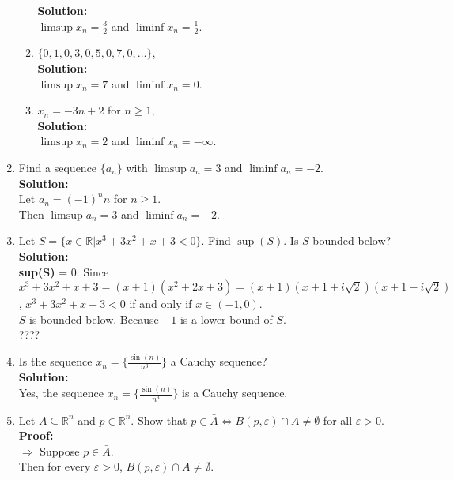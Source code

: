 \documentclass{article}
\begin{document}
\begin{enumerate}
\begin{enumerate}
    \textbf{Solution:} \\
    $\limsup x_n = \frac{3}{2}$ and $\liminf x_n = \frac{1}{2}$.\\
    \item $\{0,1,0,3,0,5,0,7,0,\dots \}$,\\
    
    \textbf{Solution:} \\
    $\limsup x_n = 7$ and $\liminf x_n = 0$.\\
    \item $x_n = -3n+2$ for $n \geq 1$,\\
    
    \textbf{Solution:} \\
    $\limsup x_n = 2$ and $\liminf x_n = -\infty$.\\

\end{enumerate}
\item Find a sequence $\{a_n\}$ with $\limsup a_n = 3$ and $\liminf a_n = -2$.\\

\textbf{Solution:} \\
Let $a_n = (-1)^n n$ for $n \geq 1$. \\
Then $\limsup a_n = 3$ and $\liminf a_n = -2$.\\
\item  Let $S = \{x \in \mathbb{R} | x^3 + 3x^2 + x + 3 < 0\}$. Find $\sup(S)$. Is $S$ bounded below?\\

\textbf{Solution:} \\
\textbf{sup(S)} = 0. Since $x^3 + 3x^2 + x + 3 = (x+1)(x^2+2x+3) = (x+1)(x+1+i\sqrt{2})(x+1-i\sqrt{2})$, $x^3 + 3x^2 + x + 3 < 0$ if and only if $x \in (-1,0)$.\\
$S$ is bounded below. Because $-1$ is a lower bound of $S$.\\
????   


\item Is the sequence ${x_n} = \{\frac{\sin(n)}{n^3}\}$ a Cauchy sequence?\\

\textbf{Solution:} \\
Yes, the sequence ${x_n} = \{\frac{\sin(n)}{n^3}\}$ is a Cauchy sequence.\\

\item Let $A \subseteq \mathbb{R}^n$ and $p \in \mathbb{R}^n$. Show that $p \in \bar A \Leftrightarrow B(p,\varepsilon) \cap A \neq \emptyset$ for all $\varepsilon > 0$.\\

\textbf{Proof:} \\
$\Rightarrow$ Suppose $p \in \bar A$. \\
Then for every $\varepsilon > 0$, $B(p,\varepsilon) \cap A \neq \emptyset$.\\




\end{enumerate}
\end{document}
